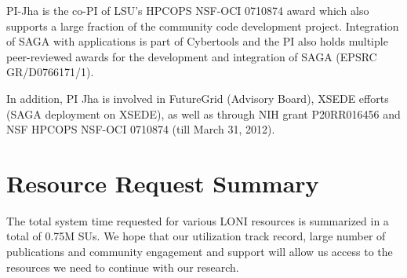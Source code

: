 \documentclass[a4paper,11pt]{article}
\newcommand{\up}{\vspace*{-1em}}
\begin{document}
PI-Jha is the co-PI of LSU's HPCOPS NSF-OCI 0710874 award which also supports a large fraction of the community code development project. Integration of SAGA with applications is part of Cybertools and the PI also holds multiple peer-reviewed awards for the development and integration of SAGA (EPSRC GR/D0766171/1). %

In addition, PI Jha is involved in FutureGrid (Advisory Board), XSEDE efforts (SAGA deployment on XSEDE), as well as through NIH grant P20RR016456 and NSF HPCOPS NSF-OCI 0710874 (till March 31, 2012).

\section{Resource Request Summary}



The total system time requested for various LONI resources is summarized in a total of 0.75M SUs.  We hope that our utilization track record, large number of publications and community engagement and support will allow us access to the resources we need to continue with our research.




\end{document}
